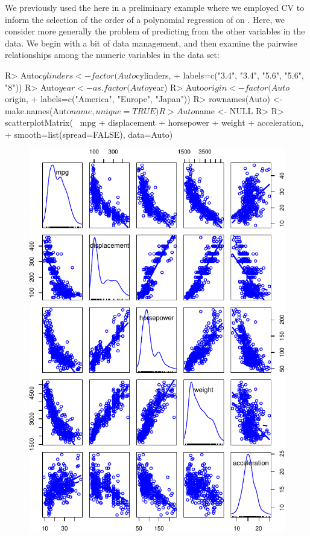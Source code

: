 \documentclass[
]{jss}
\begin{document}
We previously used the  here in a preliminary example where
we employed CV to inform the selection of the order of a polynomial
regression of  on . Here, we consider more
generally the problem of predicting  from the other variables
in the  data. We begin with a bit of data management, and
then examine the pairwise relationships among the numeric variables in
the data set:

\begin{CodeChunk}
\begin{CodeInput}
R> Auto$cylinders <- factor(Auto$cylinders,
+                          labels=c("3.4", "3.4", "5.6", "5.6", "8"))
R> Auto$year <- as.factor(Auto$year)
R> Auto$origin <- factor(Auto$origin,
+                       labels=c("America", "Europe", "Japan"))
R> rownames(Auto) <- make.names(Auto$name, unique=TRUE)
R> Auto$name <- NULL
R> 
R> scatterplotMatrix(~ mpg + displacement + horsepower + weight + acceleration, 
+                   smooth=list(spread=FALSE), data=Auto)
\end{CodeInput}
\begin{figure}

{\centering \includegraphics[width=1\linewidth]{JSS-article-reduced_files/figure-latex/Auto-explore-1} 

}
\end{figure}
\end{CodeChunk}
\end{document}
